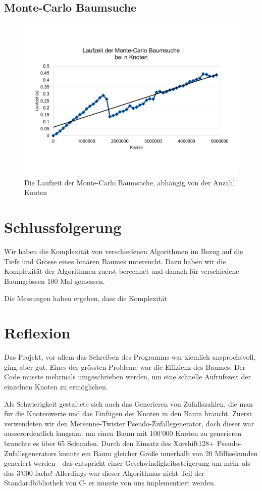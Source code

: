 \documentclass[a4paper,11pt]{article}
\newcommand{\CC}{C\nolinebreak\hspace{-.05em}\raisebox{.4ex}{\tiny\bf +}\nolinebreak\hspace{-.10em}\raisebox{.4ex}{\tiny\bf +}\hspace{.1em}}
\begin{document}
\subsection{Monte-Carlo Baumsuche}

	\begin{figure}[ht]
		\centering
		\includegraphics[width=0.85\linewidth]{img/MCTS_size.pdf}
		\caption{Die Laufzeit der Monte-Carlo Baumsuche, abhängig von der Anzahl Knoten}
		\label{fig:mcts_time}
	\end{figure}


\section{Schlussfolgerung}
Wir haben die Komplexität von verschiedenen Algorithmen im Bezug auf die Tiefe und Grösse eines binären Baumes untersucht. Dazu haben wir die Komplexität der Algorithmen zuerst berechnet und danach für verschiedene Baumgrössen 100 Mal gemessen.

Die Messungen haben ergeben, dass die Komplexität

\section{Reflexion}
Das Projekt, vor allem das Schreiben des Programms war ziemlich ansprochsvoll, ging aber gut. Eines der grössten Probleme war die Effizienz des Baumes. Der Code musste mehrmals umgeschrieben werden, um eine schnelle Aufrufezeit der einzelnen Knoten zu ermöglichen.

Als Schwierigkeit gestaltete sich auch das Generieren von Zufallszahlen, die man für die Knotenwerte und das Einfügen der Knoten in den Baum braucht. Zuerst verwendeten wir den Mersenne-Twister Pseudo-Zufallsgenerator, doch dieser war ausserordentlich langsam: um einen Baum mit 100'000 Knoten zu generieren brauchte es über 65 Sekunden. Durch den Einsatz des Xorshift128+ Pseudo-Zufallsgenerators konnte ein Baum gleicher Größe innerhalb von 20 Millisekunden generiert werden - das entspricht einer Geschwindigkeitssteigerung um mehr als das 3'000-fache! Allerdings war dieser Algorithmus nicht Teil der Standardbibliothek von \CC - er musste von uns implementiert werden.
\end{document}
